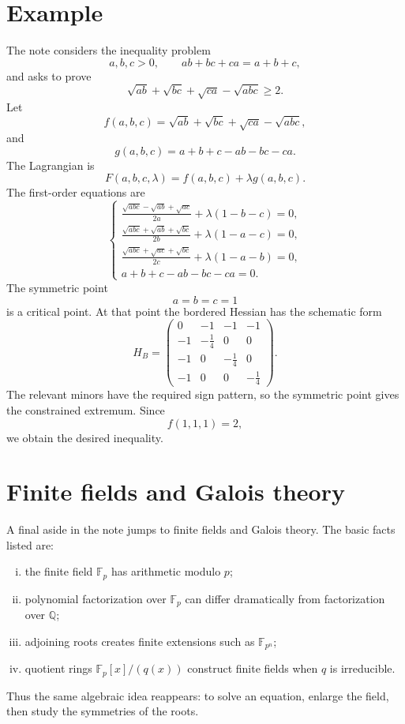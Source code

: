 \section{Example}

The note considers the inequality problem
\[
  a,b,c>0,\qquad ab+bc+ca=a+b+c,
\]
and asks to prove
\[
  \sqrt{ab}+\sqrt{bc}+\sqrt{ca}-\sqrt{abc}\ge2.
\]
Let
\[
  f(a,b,c)=\sqrt{ab}+\sqrt{bc}+\sqrt{ca}-\sqrt{abc},
\]
and
\[
  g(a,b,c)=a+b+c-ab-bc-ca.
\]
The Lagrangian is
\[
  F(a,b,c,\lambda)=f(a,b,c)+\lambda g(a,b,c).
\]
The first-order equations are
\[
\begin{cases}
\displaystyle \frac{\sqrt{abc}-\sqrt{ab}+\sqrt{ac}}{2a}+\lambda(1-b-c)=0,\\
\displaystyle \frac{\sqrt{abc}+\sqrt{ab}+\sqrt{bc}}{2b}+\lambda(1-a-c)=0,\\
\displaystyle \frac{\sqrt{abc}+\sqrt{ac}+\sqrt{bc}}{2c}+\lambda(1-a-b)=0,\\
a+b+c-ab-bc-ca=0.
\end{cases}
\]
The symmetric point
\[
  a=b=c=1
\]
is a critical point.  At that point the bordered Hessian has the schematic form
\[
  H_B=
  \begin{pmatrix}
  0&-1&-1&-1\\
  -1&-\frac14&0&0\\
  -1&0&-\frac14&0\\
  -1&0&0&-\frac14
  \end{pmatrix}.
\]
The relevant minors have the required sign pattern, so the symmetric point gives the constrained extremum.  Since
\[
  f(1,1,1)=2,
\]
we obtain the desired inequality.

\section{Finite fields and Galois theory}

A final aside in the note jumps to finite fields and Galois theory.  The basic facts listed are:
\begin{enumerate}[(i)]
  \item the finite field \(\mathbb F_p\) has arithmetic modulo \(p\);
  \item polynomial factorization over \(\mathbb F_p\) can differ dramatically from factorization over \(\mathbb Q\);
  \item adjoining roots creates finite extensions such as \(\mathbb F_{p^n}\);
  \item quotient rings \(\mathbb F_p[x]/(q(x))\) construct finite fields when \(q\) is irreducible.

\end{enumerate}
Thus the same algebraic idea reappears: to solve an equation, enlarge the field, then study the symmetries of the roots.

